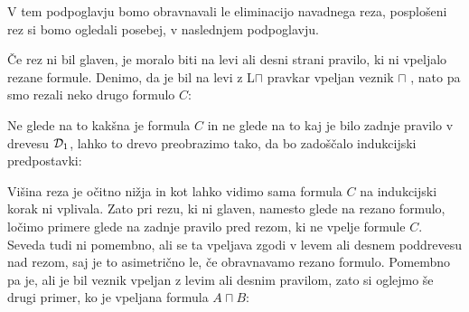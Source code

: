 V tem podpoglavju bomo obravnavali le eliminacijo navadnega reza, posplošeni rez si bomo ogledali posebej, v naslednjem podpoglavju.

Če rez ni bil glaven, je moralo biti na levi ali desni strani pravilo, ki ni vpeljalo rezane formule. Denimo, da je bil na levi z L$\sqcap$ pravkar vpeljan veznik $\sqcap$ , nato pa smo rezali neko drugo formulo $C$:
\begin{prooftree}

\end{prooftree}
Ne glede na to kakšna je formula $C$ in ne glede na to kaj je bilo zadnje pravilo v drevesu $\D_1$, lahko to drevo preobrazimo tako, da bo zadoščalo indukcijski predpostavki:
\begin{prooftree}
\end{prooftree}
Višina reza je očitno nižja in kot lahko vidimo sama formula $C$ na indukcijski korak ni vplivala. Zato pri rezu, ki ni glaven, namesto glede na rezano formulo, ločimo primere glede na zadnje pravilo pred rezom, ki ne vpelje formule $C$. Seveda tudi ni pomembno, ali se ta vpeljava zgodi v levem ali desnem poddrevesu nad rezom, saj je to asimetrično le, če obravnavamo rezano formulo. Pomembno pa je, ali je bil veznik vpeljan z levim ali desnim pravilom, zato si oglejmo še drugi primer, ko je vpeljana formula $A \sqcap B$:
\begin{prooftree}

\end{prooftree}
\dol
\begin{prooftree}


\end{prooftree}
